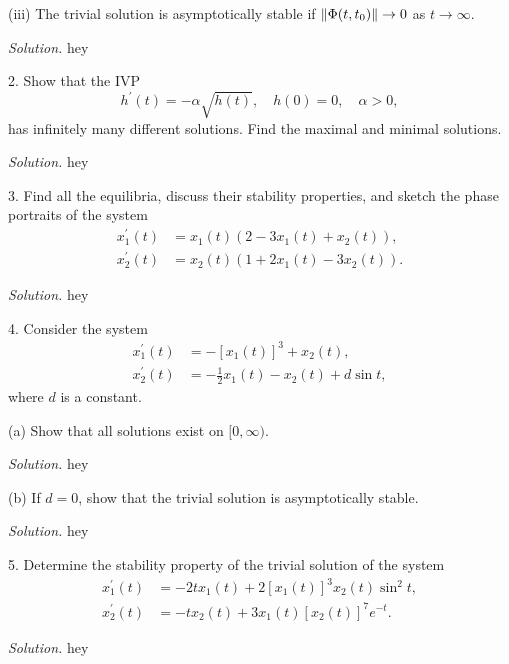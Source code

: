 \documentclass{article}
\begin{document}
\vspace{5mm}

(iii) The trivial solution is asymptotically stable if
$\enVert[0]{\Phi(t, t_0)} \to 0$ as $t \to \infty$.

\textit{Solution.}
hey

\newpage

2. Show that the IVP
%
\begin{equation*}
    h^\prime(t) = - \alpha \sqrt{h(t)}, \quad h(0) = 0, \quad \alpha > 0,
\end{equation*}
%
has infinitely many different solutions. Find the maximal and minimal solutions.

\textit{Solution.}
hey

\newpage

3. Find all the equilibria, discuss their stability properties, and sketch the phase
portraits of the system
%
\begin{align*}
    x_1^\prime(t) &= x_1(t) (2 - 3 x_1(t) + x_2(t)), \\
    x_2^\prime(t) &= x_2(t) (1 + 2 x_1(t) - 3 x_2(t)).
\end{align*}

\textit{Solution.}
hey

\newpage

4. Consider the system
%
\begin{align*}
    x_1^\prime(t) &= - [x_1(t)]^3 + x_2(t), \\
    x_2^\prime(t) &= -\frac{1}{2} x_1(t) - x_2(t) + d \sin t,
\end{align*}
%
where $d$ is a constant.

(a) Show that all solutions exist on $[0, \infty)$.

\textit{Solution.}
hey

\vspace{5mm}

(b) If $d = 0$, show that the trivial solution is asymptotically stable.

\textit{Solution.}
hey

\newpage

5. Determine the stability property of the trivial solution of the system
%
\begin{align*}
    x_1^\prime(t) &= -2t x_1(t) + 2 [x_1(t)]^3 x_2(t) \sin^2 t, \\
    x_2^\prime(t) &= -t x_2(t) + 3 x_1(t) [x_2(t)]^7 e^{-t}.
\end{align*}

\textit{Solution.}
hey
\end{document}
